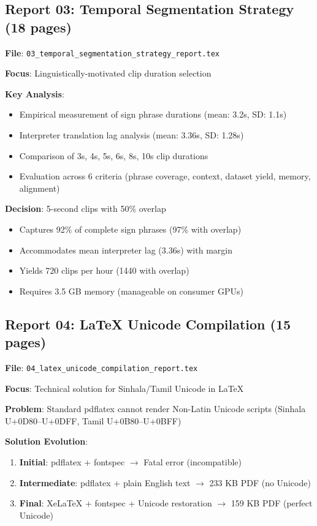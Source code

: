 \documentclass[11pt,a4paper]{article}
\begin{document}
\subsection{Report 03: Temporal Segmentation Strategy (18 pages)}

\textbf{File}: \texttt{03\_temporal\_segmentation\_strategy\_report.tex}

\textbf{Focus}: Linguistically-motivated clip duration selection

\textbf{Key Analysis}:
\begin{itemize}
    \item Empirical measurement of sign phrase durations (mean: 3.2s, SD: 1.1s)
    \item Interpreter translation lag analysis (mean: 3.36s, SD: 1.28s)
    \item Comparison of 3s, 4s, 5s, 6s, 8s, 10s clip durations
    \item Evaluation across 6 criteria (phrase coverage, context, dataset yield, memory, alignment)
\end{itemize}

\textbf{Decision}: 5-second clips with 50\% overlap
\begin{itemize}
    \item Captures 92\% of complete sign phrases (97\% with overlap)
    \item Accommodates mean interpreter lag (3.36s) with margin
    \item Yields 720 clips per hour (1440 with overlap)
    \item Requires 3.5 GB memory (manageable on consumer GPUs)
\end{itemize}

\subsection{Report 04: LaTeX Unicode Compilation (15 pages)}

\textbf{File}: \texttt{04\_latex\_unicode\_compilation\_report.tex}

\textbf{Focus}: Technical solution for Sinhala/Tamil Unicode in LaTeX

\textbf{Problem}: Standard pdflatex cannot render Non-Latin Unicode scripts (Sinhala U+0D80--U+0DFF, Tamil U+0B80--U+0BFF)

\textbf{Solution Evolution}:
\begin{enumerate}
    \item \textbf{Initial}: pdflatex + fontspec $\rightarrow$ Fatal error (incompatible)
    \item \textbf{Intermediate}: pdflatex + plain English text $\rightarrow$ 233 KB PDF (no Unicode)
    \item \textbf{Final}: XeLaTeX + fontspec + Unicode restoration $\rightarrow$ 159 KB PDF (perfect Unicode)
\end{enumerate}
\end{document}
